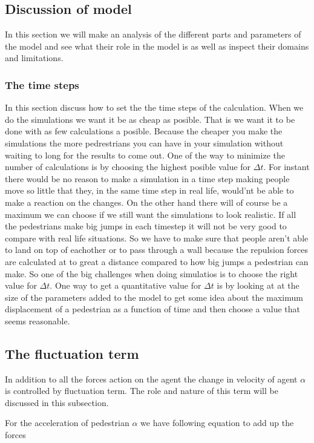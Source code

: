 \subsection{Discussion of model}
In this section we will make an analysis of the different parts and 
parameters of the model and see what their role in the model is as well 
as inspect their domains and limitations. 

\subsubsection{The time steps}
In this section discuss how to set the the time steps of the calculation. 
When we do the simulations we want it be as cheap as posible. That is we want it to be done with as few calculations a posible. Because the cheaper you make the simulations the more pedrestrians you can have in your simulation without waiting to long for the results to come out. One of the way to minimize the number of calculations is by choosing the highest posible value for $\Delta t$. For instant there would be no reason to make a simulation in a time step making people move so little that they, in the same time step in real life, would'nt be able to make a reaction on the changes.  
On the other hand there will of course be a maximum we can choose if we still want the simulations to look realistic. If all the pedestrians make big jumps in each timestep it will not be very good to compare with real life situations. So we have to make sure that people aren't able to land on top of eachother or to pass through a wall because the repulsion forces are calculated at to great a distance compared to how big jumps a pedestrian can make.
So one of the big challenges when doing simulatios is to choose the right value for $\Delta t$. One way to get a quantitative value for $\Delta t$ is by looking at at the size of the parameters added to the model to get some idea about the maximum displacement of a pedestrian as a function of time and then choose a value that seems reasonable.


\subsection{The fluctuation term}
In addition to all the forces action on the agent the change in velocity of agent 
$\alpha$ is controlled by fluctuation term. The role and nature of this term will 
be discussed in this subsection.

For the acceleration of pedestrian $\alpha$ we have following equation to add up the forces


